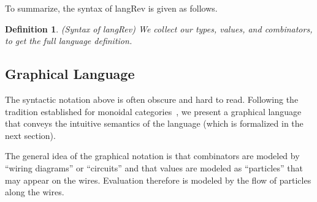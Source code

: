 \documentclass[preprint]{sigplanconf}
\newtheorem{definition}[theorem]{Definition}
\begin{document}
To summarize, the syntax of {{langRev}} is given as follows. 

\begin{definition}{(Syntax of {{langRev}})}
\label{def:langRev}
We collect our types, values, and combinators, to get the full language
definition.
%
\end{definition}

\subsection{Graphical Language}

The syntactic notation above is often obscure and hard to read.  Following
the tradition established for monoidal
categories~\cite{springerlink:10.1007/978-3-642-12821-94}, we present a
graphical language that conveys the intuitive semantics of the language
(which is formalized in the next section).

The general idea of the graphical notation is that combinators are modeled by
``wiring diagrams'' or ``circuits'' and that values are modeled as
``particles'' that may appear on the wires. Evaluation therefore is modeled
by the flow of particles along the wires.

\end{document}
